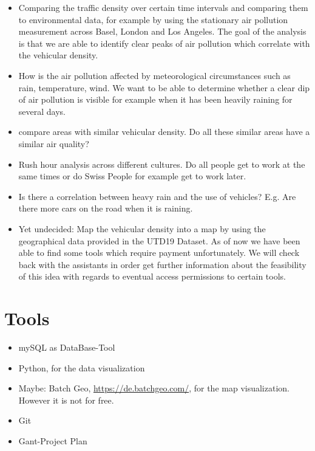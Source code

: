 \documentclass{article}
\begin{document}
\begin{itemize}
	\item Comparing the traffic density over certain time intervals and comparing them to environmental data, for example by using the stationary air pollution measurement across Basel, London and Los Angeles. The goal of the analysis is that we are able to identify clear peaks of air pollution which correlate with the vehicular density.
	\item How is the air pollution affected by meteorological circumstances such as rain, temperature, wind. We want to be able to determine whether a clear dip of air pollution is visible for example when it has been heavily raining for several days.
	\item compare areas with similar vehicular density. Do all these similar areas have a similar air quality?
	\item Rush hour analysis across different cultures. Do all people get to work at the same times or do Swiss People for example get to work later.
	\item Is there a correlation between heavy rain and the use of vehicles? E.g. Are there more cars on the road when it is raining.
	\item Yet undecided: Map the vehicular density into a map by using the geographical data provided in the UTD19 Dataset. As of now we have been able to find some tools which require payment unfortunately. We will check back with the assistants in order get further information about the feasibility of this idea with regards to eventual access permissions to certain tools.
	  

\end{itemize}
\section{Tools}
\begin{itemize}
	\item mySQL as DataBase-Tool
	\item Python, for the data visualization
	\item Maybe: Batch Geo, \url{https://de.batchgeo.com/}, for the map visualization. However it is not for free.
	\item Git
	\item Gant-Project Plan
	
\end{itemize}
\end{document}
